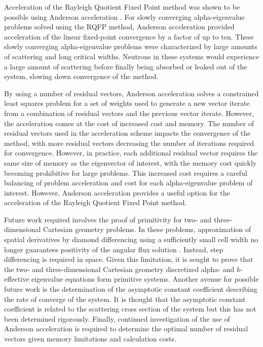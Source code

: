 Acceleration of the Rayleigh Quotient Fixed Point method was shown to be possible using Anderson acceleration \cite{walker_anderson_2011}. For slowly converging alpha-eigenvalue problems solved using the RQFP method, Anderson acceleration provided acceleration of the linear fixed-point convergence by a factor of up to ten. These slowly converging alpha-eigenvalue problems were characterized by large amounts of scattering and long critical widths. Neutrons in these systems would experience a large amount of scattering before finally being absorbed or leaked out of the system, slowing down convergence of the method.

By using a number of residual vectors, Anderson acceleration solves a constrained least squares problem for a set of weights used to generate a new vector iterate from a combination of residual vectors and the previous vector iterate. However, the acceleration comes at the cost of increased cost and memory. The number of residual vectors used in the acceleration scheme impacts the convergence of the method, with more residual vectors decreasing the number of iterations required for convergence. However, in practice, each additional residual vector requires the same size of memory as the eigenvector of interest, with the memory cost quickly becoming prohibitive for large problems. This increased cost requires a careful balancing of problem acceleration and cost for each alpha-eigenvalue problem of interest. However, Anderson acceleration provides a useful option for the acceleration of the Rayleigh Quotient Fixed Point method.

Future work required involves the proof of primitivity for two- and three-dimensional Cartesian geometry problems. In these problems, approximation of spatial derivatives by diamond differencing using a sufficiently small cell width no longer guarantees positivity of the angular flux solution \cite{}. Instead, step differencing is required in space. Given this limitation, it is sought to prove that the two- and three-dimensional Cartesian geometry discretized alpha- and $k$-effective eigenvalue equations form primitive systems. Another avenue for possible future work is the determination of the asymptotic constant coefficient describing the rate of converge of the system. It is thought that the asymptotic constant coefficient is related to the scattering cross section of the system but this has not been determined rigorously. Finally, continued investigation of the use of Anderson acceleration is required to determine the optimal number of residual vectors given memory limitations and calculation costs.